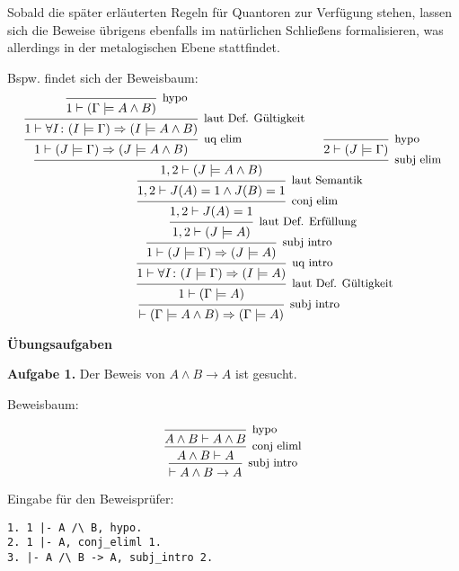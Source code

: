 \documentclass[8pt]{beamer}
\newcommand{\inote}[1]{{\small #1}}
\newcommand{\strong}[1]{\textsf{\textbf{#1}}}
\newcommand{\centerheadline}[1]{%
  \begin{center}\strong{#1}\end{center}}
\newcommand{\parspace}{\vspace{0.8em}}
\newcommand{\cond}{\rightarrow}
\begin{document}
\begin{frame}
Sobald die später erläuterten Regeln für Quantoren zur Verfügung stehen,
lassen sich die Beweise übrigens ebenfalls im natürlichen Schließens
formalisieren, was allerdings in der metalogischen Ebene stattfindet.\pause

\parspace
Bspw. findet sich der Beweisbaum:
\[\begin{prooftree}
                      \infer0[\inote{hypo}]{1\vdash (\Gamma\models A\land B)}
                    \infer1[\inote{laut Def. Gültigkeit}]{1\vdash\forall I\colon (I\models\Gamma)\Rightarrow (I\models A\land B)}
                  \infer1[\inote{uq elim}]{1\vdash (J\models\Gamma)\Rightarrow (J\models A\land B)}
                  \infer0[\inote{hypo}]{2\vdash (J\models\Gamma)}
               \infer2[\inote{subj elim}]{1, 2\vdash (J\models A\land B)}
             \infer1[\inote{laut Semantik}]{1, 2\vdash J(A)=1\land J(B)=1}
           \infer1[\inote{conj elim}]{1, 2\vdash J(A)=1}
         \infer1[\inote{laut Def. Erfüllung}]{1, 2\vdash (J\models A)}
       \infer1[\inote{subj intro}]{1\vdash (J\models\Gamma)\Rightarrow (J\models A)}
     \infer1[\inote{uq intro}]{1\vdash\forall I\colon (I\models\Gamma)\Rightarrow (I\models A)}
  \infer1[\inote{laut Def. Gültigkeit}]{1\vdash (\Gamma\models A)}
\infer1[\inote{subj intro}]{\vdash (\Gamma\models A\land B)\Rightarrow (\Gamma\models A)}
\end{prooftree}\]
\end{frame}

\begin{frame}
\centerheadline{Übungsaufgaben}
\end{frame}

\begin{frame}[t,fragile]
\vspace{3em}
\strong{Aufgabe 1.}
Der Beweis von $A\land B\cond A$ ist gesucht.\pause

\parspace
Beweisbaum:

\[\begin{prooftree}
    \infer0[\inote{hypo}]{A\land B\vdash A\land B}
  \infer1[\inote{conj eliml}]{A\land B\vdash A}
\infer1[\inote{subj intro}]{\vdash A\land B\cond A}
\end{prooftree}\]

\vspace{1em}
Eingabe für den Beweisprüfer:

\begin{lstlisting}[xleftmargin=4em]
1. 1 |- A /\ B, hypo.
2. 1 |- A, conj_eliml 1.
3. |- A /\ B -> A, subj_intro 2.
\end{lstlisting}
\end{frame}
\end{document}
